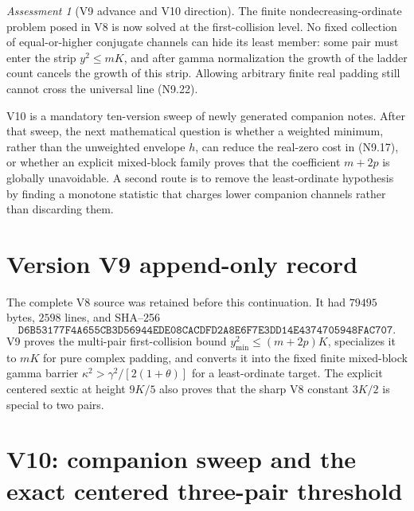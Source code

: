 \documentclass[11pt]{article}
\theoremstyle{definition}
\theoremstyle{remark}
\newtheorem{assessment}[theorem]{Assessment}
\begin{document}
\begin{assessment}[V9 advance and V10 direction]
The finite nondecreasing-ordinate problem posed in V8 is now solved at the
first-collision level.  No fixed collection of equal-or-higher conjugate
channels can hide its least member: some pair must enter the strip
\(y^2\le mK\), and after gamma normalization the growth of the ladder count
cancels the growth of this strip.  Allowing arbitrary finite real padding
still cannot cross the universal line \textup{(N9.22)}.

V10 is a mandatory ten-version sweep of newly generated companion notes.
After that sweep, the next mathematical question is whether a weighted
minimum, rather than the unweighted envelope \(h\), can reduce the real-zero
cost in \textup{(N9.17)}, or whether an explicit mixed-block family proves
that the coefficient \(m+2p\) is globally unavoidable.  A second route is
to remove the least-ordinate hypothesis by finding a monotone statistic that
charges lower companion channels rather than discarding them.
\end{assessment}

\section*{Version V9 append-only record}
The complete V8 source was retained before this continuation.  It had
\(79495\) bytes, \(2598\) lines, and SHA--256
\[
 \texttt{D6B53177F4A655CB3D56944EDE08CACDFD2A8E6F7E3DD14E4374705948FAC707}.
\]
V9 proves the multi-pair first-collision bound
\(y_{\min}^2\le(m+2p)K\), specializes it to \(mK\) for pure complex padding,
and converts it into the fixed finite mixed-block gamma barrier
\(\kappa^2>\gamma^2/[2(1+\theta)]\) for a least-ordinate target.  The explicit
centered sextic at height \(9K/5\) also proves that the sharp V8 constant
\(3K/2\) is special to two pairs.




\section{V10: companion sweep and the exact centered three-pair threshold}
\label{sec:grh-v10}
\end{document}

